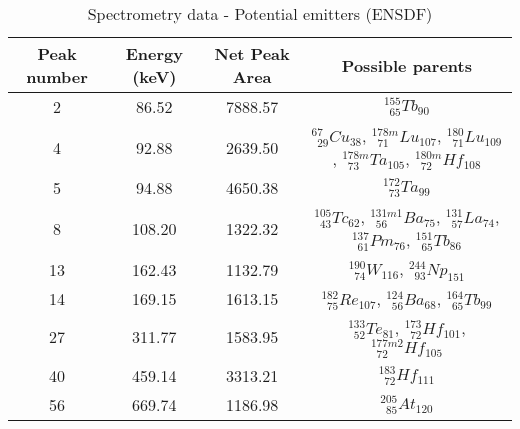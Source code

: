 \renewcommand{\arraystretch}{2}
\begin{table}[!htb]
    \centering
        \begin{tabular}{cccc}
        \hline
        Peak number & Energy (keV) & Net Peak Area & Possible parents \\ \hline\hline
		2           & 86.52        & 7888.57       & $^{155}_{\phantom{0}65}Tb_{90}$ \\
		4           & 92.88        & 2639.50       & $^{67}_{\phantom{0}29}Cu_{38}$, $^{178m}_{\phantom{0}71}Lu_{107}$, $^{180}_{\phantom{0}71}Lu_{109}$, $^{178m}_{\phantom{0}73}Ta_{105}$, $^{180m}_{\phantom{0}72}Hf_{108}$ \\
		5           & 94.88        & 4650.38       & $^{172}_{\phantom{0}73}Ta_{99}$ \\
		8           & 108.20       & 1322.32       & $^{105}_{\phantom{0}43}Tc_{62}$, $^{131m1}_{\phantom{0}56}Ba_{75}$, $^{131}_{\phantom{0}57}La_{74}$, $^{137}_{\phantom{0}61}Pm_{76}$, $^{151}_{\phantom{0}65}Tb_{86}$ \\
		13          & 162.43       & 1132.79       & $^{190}_{\phantom{0}74}W_{116}$, $^{244}_{\phantom{0}93}Np_{151}$ \\
		14          & 169.15       & 1613.15       & $^{182}_{\phantom{0}75}Re_{107}$, $^{124}_{\phantom{0}56}Ba_{68}$, $^{164}_{\phantom{0}65}Tb_{99}$ \\
		27          & 311.77       & 1583.95       & $^{133}_{\phantom{0}52}Te_{81}$, $^{173}_{\phantom{0}72}Hf_{101}$, $^{177m2}_{\phantom{0}72}Hf_{105}$\\
		40          & 459.14       & 3313.21       & $^{183}_{\phantom{0}72}Hf_{111}$\\
		56          & 669.74       & 1186.98       & $^{205}_{\phantom{0}85}At_{120}$
        \end{tabular}
        \caption{Spectrometry data - Potential emitters (ENSDF)}\label{tab:specdata_p}
\end{table}

